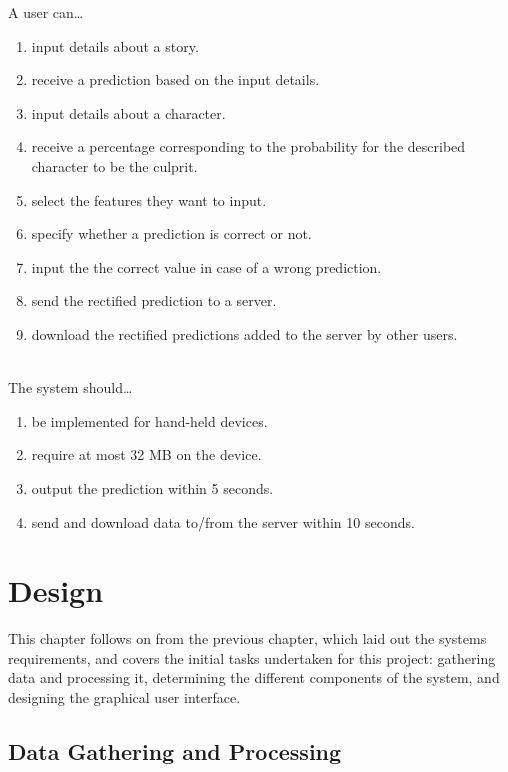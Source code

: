 \documentclass{mproj}
\begin{document}
A user can\ldots
\begin{enumerate}[topsep=0pt]\label{user_stories}
	\item input details about a story.
	\item receive a prediction based on the input details.
	\item input details about a character.
	\item receive a percentage corresponding to the probability for the described character to be the culprit.
	\item select the features they want to input.
	\item specify whether a prediction is correct or not.
	\item input the the correct value in case of a wrong prediction.
	\item send the rectified prediction to a server.
	\item download the rectified predictions added to the server by other users. \\\\
\end{enumerate}

The system should\ldots
\begin{enumerate}[topsep=0pt]\label{constraints}
	\item be implemented for hand-held devices.
	\item require at most 32 MB on the device.
	\item output the prediction within 5 seconds.
	\item send and download data to/from the server within 10 seconds.
\end{enumerate}


\chapter{Design}

This chapter follows on from the previous chapter, which laid out the systems requirements, and covers the initial tasks undertaken for this project: gathering data and processing it, determining the different components of the system, and designing the graphical user interface. \par

\section{Data Gathering and Processing}\label{data_process}
\end{document}
